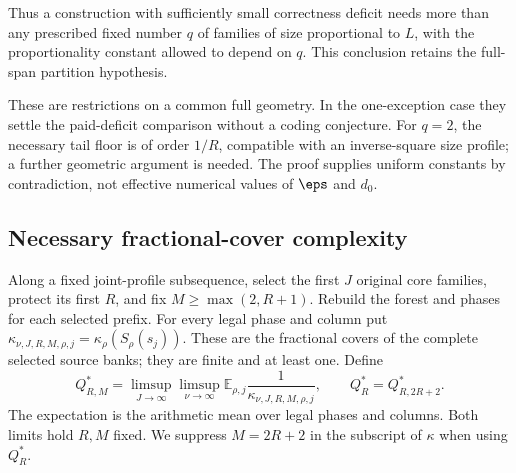 Thus a construction with sufficiently small correctness deficit needs
more than any prescribed fixed number $q$ of families of size proportional
to $L$, with the proportionality constant allowed to depend on $q$.
This conclusion retains the full-span partition hypothesis.

These are restrictions on a common full geometry. In the one-exception
case they settle the paid-deficit comparison without a coding conjecture.
For $q=2$, the necessary tail floor is of order $1/R$, compatible with
an inverse-square size profile; a further geometric argument is needed.
The proof supplies uniform constants by contradiction, not effective
numerical values of $\eps$ and $d_0$.

\subsection{Necessary fractional-cover complexity}

Along a fixed joint-profile subsequence, select the first $J$ original
core families, protect its first $R$, and fix $M\ge\max(2,R+1)$.
Rebuild the forest and phases for each selected prefix. For every legal
phase and column put
$\kappa_{\nu,J,R,M,\rho,j}=\kappa_\rho(S_\rho(s_j))$.
These are the fractional covers of the complete selected source banks;
they are finite and at least one. Define
\begin{equation}\label{eq:reciprocal-cover-limit}
 Q_{R,M}^*=\limsup_{J\to\infty}\limsup_{\nu\to\infty}
       \mathbb E_{\rho,j}\frac1{\kappa_{\nu,J,R,M,\rho,j}},
 \qquad Q_R^*=Q_{R,2R+2}^*.
\end{equation}
The expectation is the arithmetic mean over legal phases and columns.
Both limits hold $R,M$ fixed. We suppress $M=2R+2$ in the subscript of
$\kappa$ when using $Q_R^*$.

